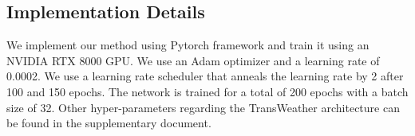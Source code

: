 \documentclass[10pt,twocolumn,letterpaper]{article}
\begin{document}
\subsection{Implementation Details}
We implement our method using Pytorch framework \cite{NEURIPS2019_9015} and train it using an NVIDIA RTX 8000 GPU. We use an Adam optimizer \cite{kingma2014adam} and a learning rate of 0.0002. We use a learning rate scheduler that anneals the learning rate by 2 after 100 and 150 epochs. The network is trained for a total of 200 epochs with a batch size of 32. Other hyper-parameters regarding the TransWeather architecture can be found in the supplementary document.


\begin{table}[]
	\centering
	
	\caption{\textbf{Quantitative Comparison on the SnowTest100k-L test dataset based on PSNR and SSIM.} .  means higher the better.} 
	
	\label{snow}
\end{table}
\end{document}
